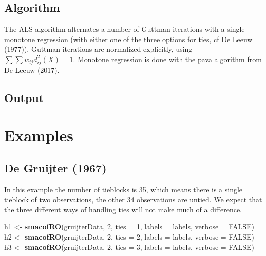 \documentclass[
  12pt,
]{article}
\newenvironment{Shaded}{\begin{snugshade}}{\end{snugshade}}
\newcommand{\AttributeTok}[1]{\textcolor[rgb]{0.13,0.29,0.53}{#1}}
\newcommand{\ConstantTok}[1]{\textcolor[rgb]{0.56,0.35,0.01}{#1}}
\newcommand{\DecValTok}[1]{\textcolor[rgb]{0.00,0.00,0.81}{#1}}
\newcommand{\FunctionTok}[1]{\textcolor[rgb]{0.13,0.29,0.53}{\textbf{#1}}}
\newcommand{\NormalTok}[1]{#1}
\newcommand{\OtherTok}[1]{\textcolor[rgb]{0.56,0.35,0.01}{#1}}
\begin{document}
\subsection{Algorithm}\label{algorithm}

The ALS algorithm alternates a number of Guttman iterations with a single monotone
regression (with either one of the three options for ties, cf De Leeuw (1977)).
Guttman iterations are normalized explicitly, using \(\sum\sum w_{ij}d_{ij}^2(X)=1\).
Monotone regression is done with the pava algorithm from De Leeuw (2017).

\subsection{Output}\label{output}

\section{Examples}\label{examples}

\subsection{De Gruijter (1967)}\label{degruijter_67}

In this example the number of tieblocks is 35, which means
there is a single tieblock of two observations, the other 34 observations are
untied. We expect that the three different ways of handling ties will not make
much of a difference.

\begin{Shaded}
\begin{Highlighting}[]
\NormalTok{h1 }\OtherTok{\textless{}{-}} \FunctionTok{smacofRO}\NormalTok{(gruijterData, }\DecValTok{2}\NormalTok{, }\AttributeTok{ties =} \DecValTok{1}\NormalTok{, }\AttributeTok{labels =}\NormalTok{ labels, }\AttributeTok{verbose =} \ConstantTok{FALSE}\NormalTok{)}
\NormalTok{h2 }\OtherTok{\textless{}{-}} \FunctionTok{smacofRO}\NormalTok{(gruijterData, }\DecValTok{2}\NormalTok{, }\AttributeTok{ties =} \DecValTok{2}\NormalTok{, }\AttributeTok{labels =}\NormalTok{ labels, }\AttributeTok{verbose =} \ConstantTok{FALSE}\NormalTok{)}
\NormalTok{h3 }\OtherTok{\textless{}{-}} \FunctionTok{smacofRO}\NormalTok{(gruijterData, }\DecValTok{2}\NormalTok{, }\AttributeTok{ties =} \DecValTok{3}\NormalTok{, }\AttributeTok{labels =}\NormalTok{ labels, }\AttributeTok{verbose =} \ConstantTok{FALSE}\NormalTok{)}
\end{Highlighting}
\end{Shaded}
\end{document}
